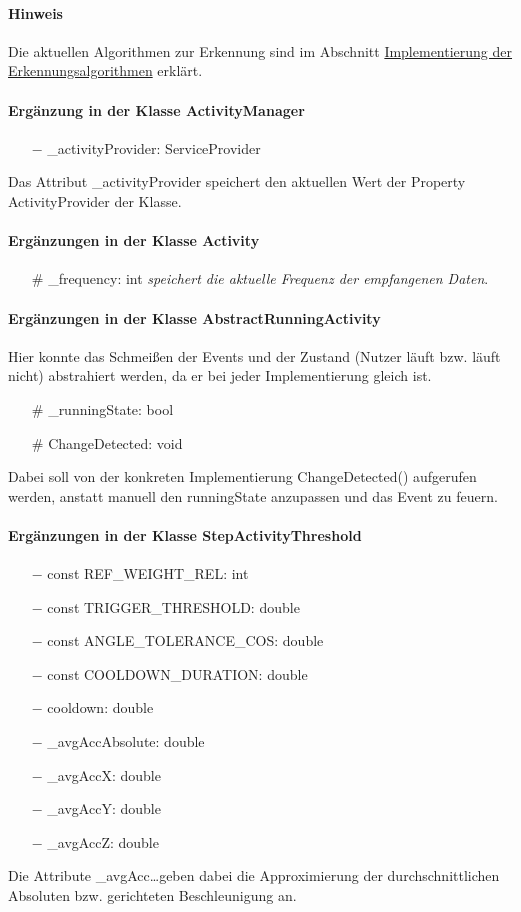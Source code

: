 \documentclass[a4paper,12pt]{article}
\begin{document}
\paragraph{Hinweis}
Die aktuellen Algorithmen zur Erkennung sind im Abschnitt \hyperref[algorithmen]{Implementierung der Erkennungsalgorithmen} erklärt.
\paragraph{Ergänzung in der Klasse ActivityManager}
\begin{itemize}
	\item [$-$]\_activityProvider: ServiceProvider 
\end{itemize}
Das Attribut \_activityProvider speichert den aktuellen Wert der Property ActivityProvider der Klasse.
\paragraph{Ergänzungen in der Klasse Activity}
\begin{itemize}
	\item [\#] \_frequency: int \textit{speichert die aktuelle Frequenz der empfangenen Daten}.
\end{itemize}
\paragraph{Ergänzungen in der Klasse AbstractRunningActivity}
Hier konnte das Schmeißen der Events und der Zustand (Nutzer läuft bzw. läuft nicht) abstrahiert werden, da er bei jeder Implementierung gleich ist.
\begin{itemize}
	\item [\#] \_runningState: bool
	\item [\#] ChangeDetected: void 
\end{itemize}
Dabei soll von der konkreten Implementierung ChangeDetected() aufgerufen werden, anstatt manuell den runningState anzupassen und das Event zu feuern.
\paragraph{Ergänzungen in der Klasse StepActivityThreshold}
\begin{itemize}
	\item [$-$] const REF\_WEIGHT\_REL: int
	\item [$-$] const TRIGGER\_THRESHOLD: double
	\item [$-$] const ANGLE\_TOLERANCE\_COS: double
	\item [$-$] const COOLDOWN\_DURATION: double
	\item [$-$] cooldown: double
	\item [$-$] \_avgAccAbsolute: double
	\item [$-$] \_avgAccX: double
	\item [$-$] \_avgAccY: double
	\item [$-$] \_avgAccZ: double
\end{itemize}
Die Attribute \_avgAcc\dots geben dabei die Approximierung der durchschnittlichen Absoluten bzw. gerichteten Beschleunigung an.
\end{document}
